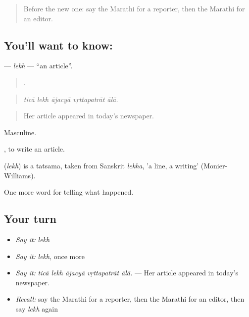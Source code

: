 \label{lesson:MR-C311-lekh}



\begin{quote}
Before the new one: say the Marathi for a reporter, then the Marathi for an editor.
\end{quote}

\subsection*{You'll want to know: }
\textbf{} — \emph{lekh} — \textquotedblleft{}an article\textquotedblright{}.

\begin{quote}
    .
\end{quote}

\begin{quote}
\emph{ticā lekh ājacyā vṛttapatrāt ālā.}
\end{quote}

\begin{quote}
Her article appeared in today's newspaper.
\end{quote}

Masculine.

 , to write an article.

\begin{cousinweb}
\textbf{} (\emph{lekh}) is a tatsama, taken from Sanskrit \emph{lekha}, 'a line, a writing' (Monier-Williams).
\end{cousinweb}

\begin{grammarlens}[title={What you've built}]
One more word for telling what happened.
\end{grammarlens}

\subsection*{Your turn}
\begin{itemize}
\raggedright
  \item \emph{Say it:} \emph{lekh}
  \item \emph{Say it:} \emph{lekh}, once more
  \item \emph{Say it:} \emph{ticā lekh ājacyā vṛttapatrāt ālā.} — Her article appeared in today's newspaper.
  \item \emph{Recall:} say the Marathi for a reporter, then the Marathi for an editor, then say \emph{lekh} again
\end{itemize}

